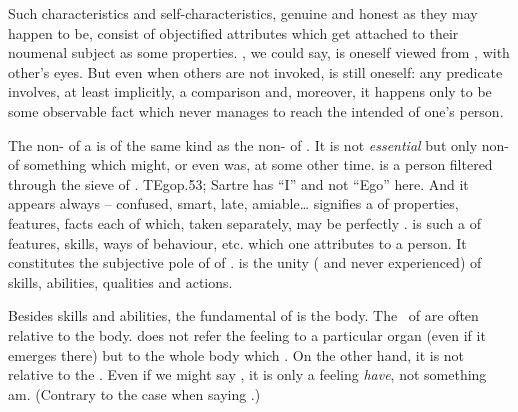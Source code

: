 Such characteristics and self-characteristics, genuine and honest as they may
happen to be, consist of {objectified} attributes which get attached to their
noumenal subject as some  properties. , we could say, is
oneself viewed from , with
other's eyes. But even when others are not invoked,  is still
 oneself: any predicate involves, at least implicitly, a comparison
and, moreover, it happens only to be some  observable fact which
never manages to reach the intended  of one's person.

The non- of a  is of the same kind as the
non- of . It is not {\em essential}  but
only non- of something which might, or even was,  at
some other time.   is a person filtered through the 
sieve of .  \citet{The Ego never appears except on the occasion
  of a reflective act.}{TEgo}{p.53; Sartre has ``I'' and not ``Ego'' here.}  And
it appears always  -- confused, smart, late, amiable\ldots {}
signifies a  of properties, features, facts each of which, taken
separately, may be perfectly .   is such a  of
features, skills, ways of behaviour, etc.  which one attributes to a person.  It
constitutes the subjective pole of  of .
  is the  unity ( and
never experienced) of skills, abilities, qualities and actions.


%
\pa Besides skills and abilities, the fundamental  of  is the
body. The \oss\ of  are often relative to the body.  does not refer the feeling to a particular organ (even if it emerges
there) but to the whole body which . On the other hand, it is not
relative to the .  Even if we might say , it is only a
feeling  {\em have}, not something  am. (Contrary to the case when
saying .)


